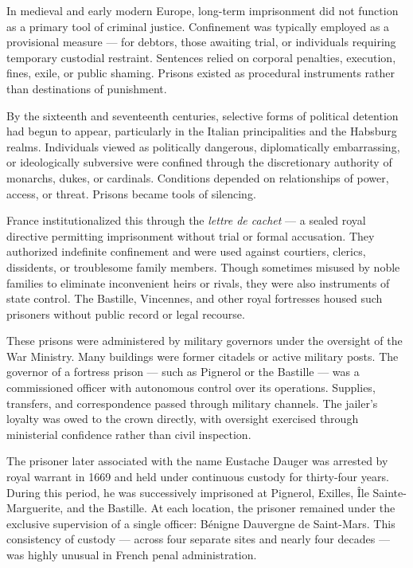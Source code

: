 In medieval and early modern Europe, long-term imprisonment did not function as a primary tool of criminal justice. Confinement was typically employed as a provisional measure — for debtors, those awaiting trial, or individuals requiring temporary custodial restraint. Sentences relied on corporal penalties, execution, fines, exile, or public shaming. Prisons existed as procedural instruments rather than destinations of punishment.

By the sixteenth and seventeenth centuries, selective forms of political detention had begun to appear, particularly in the Italian principalities and the Habsburg realms. Individuals viewed as politically dangerous, diplomatically embarrassing, or ideologically subversive were confined through the discretionary authority of monarchs, dukes, or cardinals. Conditions depended on relationships of power, access, or threat. Prisons became tools of silencing.

France institutionalized this through the \textit{lettre de cachet} — a sealed royal directive permitting imprisonment without trial or formal accusation. They authorized indefinite confinement and were used against courtiers, clerics, dissidents, or troublesome family members. Though sometimes misused by noble families to eliminate inconvenient heirs or rivals, they were also instruments of state control. The Bastille, Vincennes, and other royal fortresses housed such prisoners without public record or legal recourse.

These prisons were administered by military governors under the oversight of the War Ministry. Many buildings were former citadels or active military posts. The governor of a fortress prison — such as Pignerol or the Bastille — was a commissioned officer with autonomous control over its operations. Supplies, transfers, and correspondence passed through military channels. The jailer's loyalty was owed to the crown directly, with oversight exercised through ministerial confidence rather than civil inspection.

The prisoner later associated with the name Eustache Dauger was arrested by royal warrant in 1669 and held under continuous custody for thirty-four years. During this period, he was successively imprisoned at Pignerol, Exilles, Île Sainte-Marguerite, and the Bastille. At each location, the prisoner remained under the exclusive supervision of a single officer: Bénigne Dauvergne de Saint-Mars. This consistency of custody — across four separate sites and nearly four decades — was highly unusual in French penal administration.

